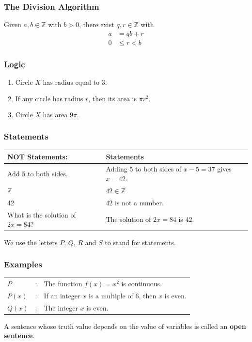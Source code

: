 \documentclass{beamer}
\newcommand{\ints}{\ensuremath{\mathbb{Z}}}
\newcommand{\bfr}[1]{\begin{frame}[fragile]\frametitle{{ #1 }}}
\begin{document}
\bfr{The Division Algorithm}

Given $a,b\in\ints$ with $b>0$, there exist $q,r\in\ints$ with
\begin{align*}
  a &= qb + r\\
  0 &\leq r < b
\end{align*}
\end{frame}


\bfr{Logic}
\begin{enumerate}
\item Circle $X$ has radius equal to 3.
\item If any circle has radius $r$, then its area is $\pi r^2$.
  
  \hrulefill
\item Circle $X$ has area $9\pi$.
\end{enumerate}

\end{frame}

\bfr{Statements}

\begin{tabular}{|l|l|}\hline
  NOT Statements: & Statements \\\hline\hline
  Add 5 to both sides. &
  \parbox{2in}{Adding 5 to both sides of\\ $x-5=37$ gives $x=42$.}\\\hline
  $\mathbb{Z}$ & $42\in\mathbb{Z}$ \\ & 42 is not a number. \\\hline
  What is the solution of $2x=84$? & The solution of $2x=84$ is 42.\\\hline
\end{tabular}

\vfill

We use the letters $P$, $Q$, $R$ and $S$ to stand for statements.

\end{frame}

\bfr{Examples}
\begin{tabular}{lll}
  $P$&:& The function $f(x)=x^2$ is continuous. \\
  $P(x)$&:& If an integer $x$ is a multiple of 6, then $x$ is even.\\
  $Q(x)$&:& The integer $x$ is even.\\
\end{tabular}
\vfill

A sentence whose truth value depends on the value of variables
is called an {\bf open sentence}.
\end{frame}
\end{document}
